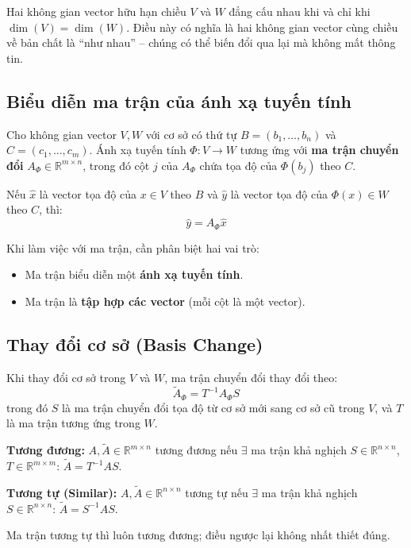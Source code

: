 \documentclass[12pt,a4paper]{article}
\begin{document}
\begin{dinhly}[title={Định lý về đẳng cấu}]
Hai không gian vector hữu hạn chiều $V$ và $W$ đẳng cấu nhau khi và chỉ khi $\dim(V) = \dim(W)$. Điều này có nghĩa là hai không gian vector cùng chiều về bản chất là ``như nhau'' -- chúng có thể biến đổi qua lại mà không mất thông tin.
\end{dinhly}

\subsection{Biểu diễn ma trận của ánh xạ tuyến tính}

\begin{dinhnghia}
Cho không gian vector $V, W$ với cơ sở có thứ tự $B = (b_1, \ldots, b_n)$ và $C = (c_1, \ldots, c_m)$. Ánh xạ tuyến tính $\Phi : V \to W$ tương ứng với \textbf{ma trận chuyển đổi} $A_\Phi \in \mathbb{R}^{m \times n}$, trong đó cột $j$ của $A_\Phi$ chứa tọa độ của $\Phi(b_j)$ theo $C$.
\end{dinhnghia}

Nếu $\hat{x}$ là vector tọa độ của $x \in V$ theo $B$ và $\hat{y}$ là vector tọa độ của $\Phi(x) \in W$ theo $C$, thì:
\[
  \hat{y} = A_\Phi \hat{x}
\]

\begin{luuy}
Khi làm việc với ma trận, cần phân biệt hai vai trò:
\begin{itemize}
  \item Ma trận biểu diễn một \textbf{ánh xạ tuyến tính}.
  \item Ma trận là \textbf{tập hợp các vector} (mỗi cột là một vector).
\end{itemize}
\end{luuy}

\subsection{Thay đổi cơ sở (Basis Change)}

Khi thay đổi cơ sở trong $V$ và $W$, ma trận chuyển đổi thay đổi theo:
\[
  \tilde{A}_\Phi = T^{-1} A_\Phi S
\]
trong đó $S$ là ma trận chuyển đổi tọa độ từ cơ sở mới sang cơ sở cũ trong $V$, và $T$ là ma trận tương ứng trong $W$.

\begin{dinhnghia}
\textbf{Tương đương:} $A, \tilde{A} \in \mathbb{R}^{m \times n}$ tương đương nếu $\exists$ ma trận khả nghịch $S \in \mathbb{R}^{n \times n}$, $T \in \mathbb{R}^{m \times m}$: $\tilde{A} = T^{-1}AS$.

\textbf{Tương tự (Similar):} $A, \tilde{A} \in \mathbb{R}^{n \times n}$ tương tự nếu $\exists$ ma trận khả nghịch $S \in \mathbb{R}^{n \times n}$: $\tilde{A} = S^{-1}AS$.

Ma trận tương tự thì luôn tương đương; điều ngược lại không nhất thiết đúng.
\end{dinhnghia}
\end{document}

